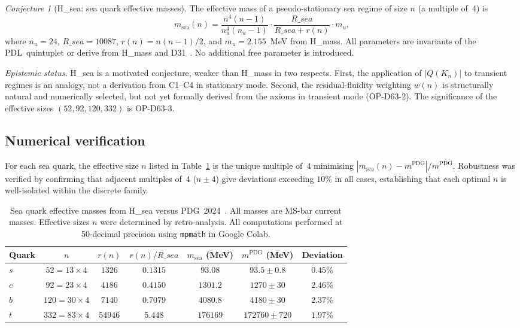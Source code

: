 \documentclass[12pt,a4paper]{article}
\def\PDL{PDL}
\def\Rsea{R\_sea}
\def\QQ{Q}
\theoremstyle{plain}
\theoremstyle{definition}
\theoremstyle{remark}
\newtheorem{conjecture}[theorem]{Conjecture}
\newcommand{\PDL}{\textnormal{PDL}}
\newcommand{\nnu}{n_u}
\newcommand{\Rsea}{R_{\mathrm{sea}}}
\newcommand{\mup}{m_u}
\newcommand{\QQ}{\mathcal{Q}}
\begin{document}
\begin{conjecture}[\texorpdfstring{H\_sea: sea quark effective masses}{H-sea: sea quark effective masses}]\label{conj:Hsea}
The effective mass of a pseudo-stationary sea regime of size $n$ (a multiple of~$4$) is
\[
m_{\mathrm{sea}}(n) = \frac{n^4(n-1)}{\nnu^4(\nnu-1)} \cdot \frac{\Rsea}{\Rsea + r(n)} \cdot \mup,
\]
where $\nnu = 24$, $\Rsea = 10087$, $r(n) = n(n-1)/2$, and $\mup = 2.155$~MeV from H\_mass. All parameters are invariants of the \PDL\ quintuplet or derive from H\_mass and D31~\cite{D31}. No additional free parameter is introduced.
\end{conjecture}

\emph{Epistemic status.} H\_sea is a motivated conjecture, weaker than H\_mass in two respects. First, the application of $|\QQ(K_n)|$ to transient regimes is an analogy, not a derivation from C1--C4 in stationary mode. Second, the residual-fluidity weighting $w(n)$ is structurally natural and numerically selected, but not yet formally derived from the axioms in transient mode (OP-D63-2). The significance of the effective sizes $(52, 92, 120, 332)$ is OP-D63-3.

\subsection{Numerical verification}
\label{subsec:numerics_sea}

For each sea quark, the effective size $n$ listed in Table~\ref{tab:Hsea} is the unique multiple of~$4$ minimising $|m_{\mathrm{sea}}(n) - m^{\mathrm{PDG}}|/m^{\mathrm{PDG}}$. Robustness was verified by confirming that adjacent multiples of~$4$ ($n \pm 4$) give deviations exceeding $10\%$ in all cases, establishing that each optimal $n$ is well-isolated within the discrete family.

\begin{table}[H]
\centering
\caption{Sea quark effective masses from H\_sea versus PDG~2024~\cite{PDG2024}. All masses are MS-bar current masses. Effective sizes $n$ were determined by retro-analysis. All computations performed at 50-decimal precision using \texttt{mpmath} in Google Colab.}
\label{tab:Hsea}
\renewcommand{\arraystretch}{1.3}
\begin{tabular}{lcccccc}
\toprule
Quark & $n$ & $r(n)$ & $r(n)/\Rsea$ & $m_{\mathrm{sea}}$ (MeV) & $m^{\mathrm{PDG}}$ (MeV) & Deviation \\
\midrule
$s$ & $52 = 13\times4$ & $1326$ & $0.1315$ & $93.08$ & $93.5 \pm 0.8$ & $0.45\%$ \\
$c$ & $92 = 23\times4$ & $4186$ & $0.4150$ & $1301.2$ & $1270 \pm 30$ & $2.46\%$ \\
$b$ & $120 = 30\times4$ & $7140$ & $0.7079$ & $4080.8$ & $4180 \pm 30$ & $2.37\%$ \\
$t$ & $332 = 83\times4$ & $54946$ & $5.448$ & $176169$ & $172760 \pm 720$ & $1.97\%$ \\
\bottomrule
\end{tabular}
\end{table}
\end{document}
